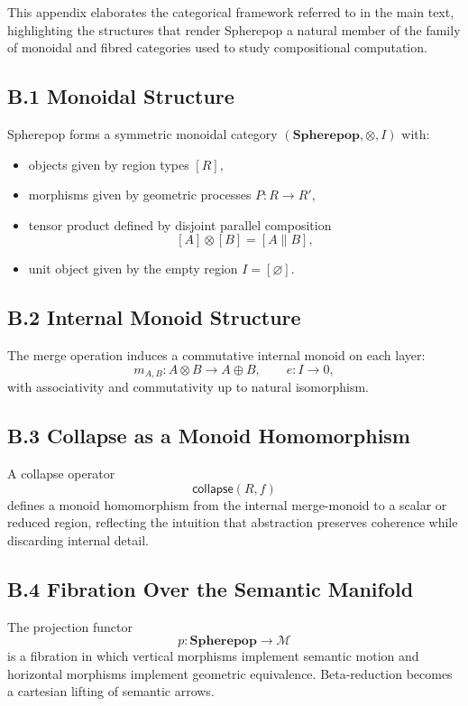 \documentclass[12pt,letterpaper]{article}
\begin{document}
This appendix elaborates the categorical framework referred to in the main text,
highlighting the structures that render Spherepop a natural member of the family
of monoidal and fibred categories used to study compositional computation.

\subsection*{B.1 Monoidal Structure}
Spherepop forms a symmetric monoidal category $(\mathbf{Spherepop}, \otimes, I)$ with:
\begin{itemize}
    \item objects given by region types $[R]$,
    \item morphisms given by geometric processes $P : R \to R'$,
    \item tensor product defined by disjoint parallel composition
      \[
      [A] \otimes [B] = [A \parallel B],
      \]
    \item unit object given by the empty region $I = [\varnothing]$.
\end{itemize}

\subsection*{B.2 Internal Monoid Structure}
The merge operation induces a commutative internal monoid on each layer:
\[
m_{A,B} : A \otimes B \to A \oplus B,
\qquad
e : I \to 0,
\]
with associativity and commutativity up to natural isomorphism.

\subsection*{B.3 Collapse as a Monoid Homomorphism}
A collapse operator
\[
\mathsf{collapse}(R,f)
\]
defines a monoid homomorphism from the internal merge-monoid to a scalar or
reduced region, reflecting the intuition that abstraction preserves coherence
while discarding internal detail.

\subsection*{B.4 Fibration Over the Semantic Manifold}
The projection functor
\[
p : \mathbf{Spherepop} \to \mathcal{M}
\]
is a fibration in which vertical morphisms implement semantic motion and
horizontal morphisms implement geometric equivalence.  Beta-reduction becomes a
cartesian lifting of semantic arrows.
\end{document}
